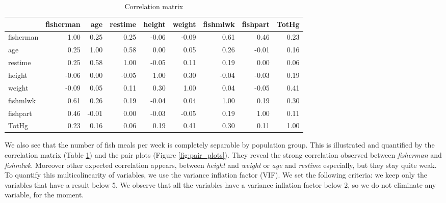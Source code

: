 \documentclass[12pt,]{article}
\begin{document}
\begin{table}[H]
\begin{center}
\caption{\label{tab:unnamed-chunk-7}\label{tbl:correlation}Correlation matrix}
\end{center}
\centering
\begin{tabular}{l|r|r|r|r|r|r|r|r}
\hline
  & fisherman & age & restime & height & weight & fishmlwk & fishpart & TotHg\\
\hline
\rowcolor{gray!6}  fisherman & 1.00 & 0.25 & 0.25 & -0.06 & -0.09 & 0.61 & 0.46 & 0.23\\
\hline
age & 0.25 & 1.00 & 0.58 & 0.00 & 0.05 & 0.26 & -0.01 & 0.16\\
\hline
\rowcolor{gray!6}  restime & 0.25 & 0.58 & 1.00 & -0.05 & 0.11 & 0.19 & 0.00 & 0.06\\
\hline
height & -0.06 & 0.00 & -0.05 & 1.00 & 0.30 & -0.04 & -0.03 & 0.19\\
\hline
\rowcolor{gray!6}  weight & -0.09 & 0.05 & 0.11 & 0.30 & 1.00 & 0.04 & -0.05 & 0.41\\
\hline
fishmlwk & 0.61 & 0.26 & 0.19 & -0.04 & 0.04 & 1.00 & 0.19 & 0.30\\
\hline
\rowcolor{gray!6}  fishpart & 0.46 & -0.01 & 0.00 & -0.03 & -0.05 & 0.19 & 1.00 & 0.11\\
\hline
TotHg & 0.23 & 0.16 & 0.06 & 0.19 & 0.41 & 0.30 & 0.11 & 1.00\\
\hline
\end{tabular}
\end{table}
We also see that the number of fish meals
per week is completely separable by population group. This is
illustrated and quantified by the correlation matrix (Table
\ref{tbl:correlation}) and the pair plots (Figure \ref{fig:pair_plots}).
They reveal the strong correlation observed between \emph{fisherman} and
\emph{fishmlwk}. Moreover other expected correlation appears, between
\emph{height} and \emph{weight} or \emph{age} and \emph{restime}
especially, but they stay quite weak. To quantify this multicolinearity
of variables, we use the variance inflation factor (VIF). We set the
following criteria: we keep only the variables that have a result below
5. We observe that all the variables have a variance inflation factor
below 2, so we do not eliminate any variable, for the moment.
\end{document}
